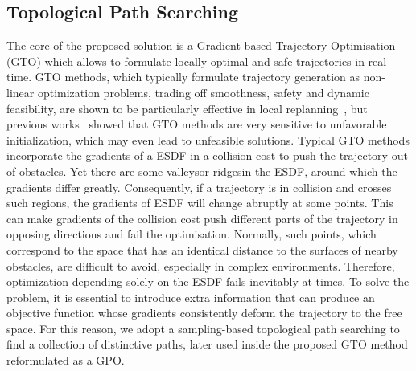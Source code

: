 \subsection{Topological Path Searching}
The core of the proposed solution is a Gradient-based Trajectory Optimisation (GTO) which allows to formulate locally optimal and safe trajectories in real-time.
GTO methods, which typically formulate trajectory generation as non-linear optimization problems, trading off smoothness, safety and dynamic feasibility, are shown
to be particularly effective in local replanning~\cite{zhou2020robust, oleynikova2016continuous, gao2017gradient, usenko2017real}, but
previous works~\cite{schulman2014motion} showed that GTO methods are very sensitive to unfavorable initialization, which may even lead to 
unfeasible solutions. Typical GTO methods incorporate the gradients of a ESDF in a collision cost to push the trajectory out of obstacles.
Yet there are some \quotopen valleys\quotclosed or \quotopen ridges\quotclosed in the ESDF, around which the gradients differ greatly.
Consequently, if a trajectory is in collision and crosses such regions, the gradients of ESDF will change abruptly at some points.
This can make gradients of the collision cost push different parts of the trajectory in opposing directions and fail the optimisation.
Normally, such points, which correspond to the space that has an identical distance to the surfaces of nearby obstacles,
are difficult to avoid, especially in complex environments. Therefore, optimization depending solely on the ESDF fails inevitably at times.
To solve the problem, it is essential to introduce extra information that can produce an objective function whose gradients consistently
deform the trajectory to the free space. For this reason, we adopt a sampling-based topological path searching to find a collection of
distinctive paths, later used inside the proposed GTO method reformulated as a GPO.

